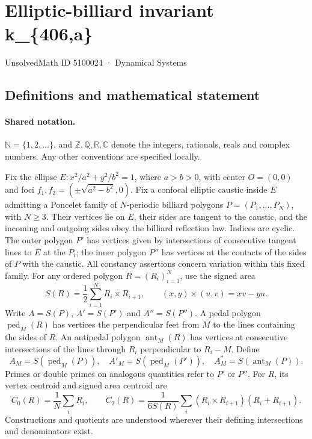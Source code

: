 \documentclass[11pt]{article}
\begin{document}
\setcounter{section}{5100023}
\section{Elliptic-billiard invariant k\_\{406,a\}}\label{5100024}
{\small\sffamily UnsolvedMath ID 5100024 · Dynamical Systems}
\subsection{Definitions and mathematical statement}

\paragraph{Shared notation.}$\mathbb N=\{1,2,\ldots\}$, and $\mathbb Z,\mathbb Q,\mathbb R,\mathbb C$ denote the integers, rationals, reals and complex numbers. Any other conventions are specified locally.


Fix the ellipse $E:x^2/a^2+y^2/b^2=1$, where $a>b>0$, with center $O=(0,0)$ and foci $f_1,f_2=(\pm\sqrt{a^2-b^2},0)$. Fix a confocal elliptic caustic inside $E$ admitting a Poncelet family of $N$-periodic billiard polygons $P=(P_1,\ldots,P_N)$, with $N\geq3$. Their vertices lie on $E$, their sides are tangent to the caustic, and the incoming and outgoing sides obey the billiard reflection law. Indices are cyclic. The outer polygon $P'$ has vertices given by intersections of consecutive tangent lines to $E$ at the $P_i$; the inner polygon $P''$ has vertices at the contacts of the sides of $P$ with the caustic. All constancy assertions concern variation within this fixed family.
For any ordered polygon $R=(R_i)_{i=1}^N$, use the signed area
\[S(R)=\frac12\sum_{i=1}^N R_i\times R_{i+1},\qquad (x,y)\times(u,v)=xv-yu.\]
Write $A=S(P)$, $A'=S(P')$ and $A''=S(P'')$. A pedal polygon $\operatorname{ped}_M(R)$ has vertices the perpendicular feet from $M$ to the lines containing the sides of $R$. An antipedal polygon $\operatorname{ant}_M(R)$ has vertices at consecutive intersections of the lines through $R_i$ perpendicular to $R_i-M$. Define
\[A_M=S(\operatorname{ped}_M(P)),\quad A'_M=S(\operatorname{ped}_M(P')),\quad A_M^*=S(\operatorname{ant}_M(P)).\]
Primes or double primes on analogous quantities refer to $P'$ or $P''$. For $R$, its vertex centroid and signed area centroid are
\[C_0(R)=\frac1N\sum_i R_i,\qquad C_2(R)=\frac{1}{6S(R)}\sum_i(R_i\times R_{i+1})(R_i+R_{i+1}).\]
Constructions and quotients are understood wherever their defining intersections and denominators exist.
\end{document}
